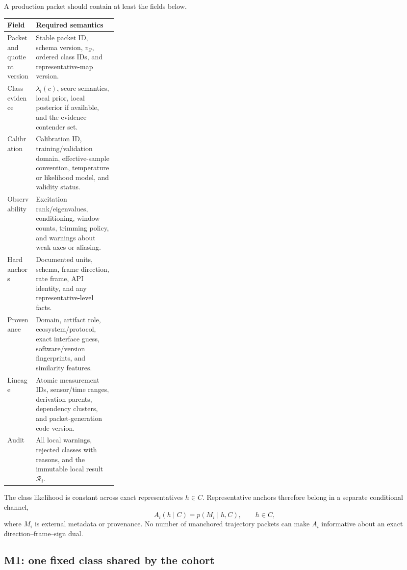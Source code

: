 \documentclass[11pt]{article}
\begin{document}
    A production packet should contain at least the fields below.
    \begin{center}
        \small
        \begin{tabularx}{\linewidth}{@{}p{0.26\linewidth}Y@{}}
\toprule
Field & Required semantics \\
\midrule
Packet and quotient version & Stable packet ID, schema version, $v_{\mathcal Q}$, ordered class IDs, and representative-map version. \\
Class evidence & $\lambda_i(c)$, score semantics, local prior, local posterior if available, and the evidence contender set. \\
Calibration & Calibration ID, training/validation domain, effective-sample convention, temperature or likelihood model, and validity status. \\
Observability & Excitation rank/eigenvalues, conditioning, window counts, trimming policy, and warnings about weak axes or aliasing. \\
Hard anchors & Documented units, schema, frame direction, rate frame, API identity, and any representative-level facts. \\
Provenance & Domain, artifact role, ecosystem/protocol, exact interface guess, software/version fingerprints, and similarity features. \\
Lineage & Atomic measurement IDs, sensor/time ranges, derivation parents, dependency clusters, and packet-generation code version. \\
Audit & All local warnings, rejected classes with reasons, and the immutable local result $\mathcal R_i$. \\
\bottomrule
        \end{tabularx}
    \end{center}

    The class likelihood is constant across exact representatives $h\in C$. Representative
    anchors therefore belong in a separate conditional channel,
    \begin{equation}
        A_i(h\mid C)=p(M_i\mid h,C),
        \qquad h\in C,
        \label{eq:cohort-representative-channel}
    \end{equation}
    where $M_i$ is external metadata or provenance. No number of unanchored trajectory
    packets can make $A_i$ informative about an exact direction--frame--sign dual.

    \subsection{M1: one fixed class shared by the cohort}
\end{document}
